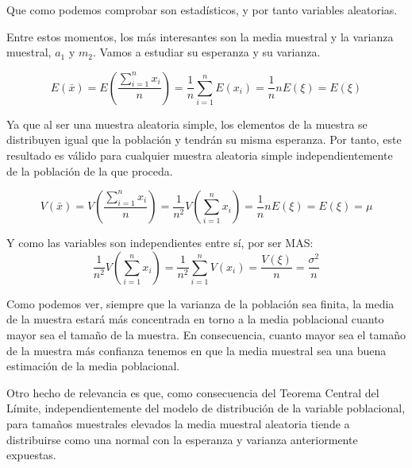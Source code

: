 Que como podemos comprobar son estad\'isticos, y por tanto variables aleatorias.

Entre estos momentos, los m\'as interesantes son la media muestral y la varianza muestral, $a_1$ y $m_2$. Vamos a estudiar su esperanza y su varianza.


\begin{equation*}
E\left(\bar{x}\right)=E\left(\dfrac{\sum_{i=1}^nx_i}{n}\right)=\dfrac{1}{n}\sum_{i=1}^nE\left(x_i\right)=\dfrac{1}{n}nE\left(\xi\right)=E\left(\xi\right)
\end{equation*}

Ya que al ser una muestra aleatoria simple, los elementos de la muestra se distribuyen igual que la poblaci\'on y tendr\'an su misma esperanza. Por tanto, este resultado es v\'alido para cualquier muestra aleatoria simple independientemente de la poblaci\'on de la que proceda.


\begin{equation*}
V\left(\bar{x}\right)=V\left(\dfrac{\sum_{i=1}^nx_i}{n}\right)=\dfrac{1}{n^2}V\left(\sum_{i=1}^nx_i\right)=\dfrac{1}{n}nE\left(\xi\right)=E\left(\xi\right)=\mu
\end{equation*}

Y como las variables son independientes entre s\'i, por ser MAS:
\begin{equation*}
\dfrac{1}{n^2}V\left(\sum_{i=1}^nx_i\right)=\dfrac{1}{n^2}\sum_{i=1}^nV\left(x_i\right)=\dfrac{V(\xi)}{n}=\dfrac{\sigma^2}{n}
\end{equation*}

Como podemos ver, siempre que la varianza de la poblaci\'on sea finita, la media de la muestra estar\'a m\'as concentrada en torno a la media poblacional cuanto mayor sea el tama\~no de la muestra. En consecuencia, cuanto mayor sea el tama\~no de la muestra m\'as confianza tenemos en que la media muestral sea una buena estimaci\'on de la media poblacional.

Otro hecho de relevancia es que, como consecuencia del Teorema Central del L\'imite, independientemente del modelo de distribuci\'on
de la variable poblacional, para tama\~nos muestrales elevados la media muestral aleatoria tiende a distribuirse como una normal con la esperanza y varianza anteriormente expuestas.

